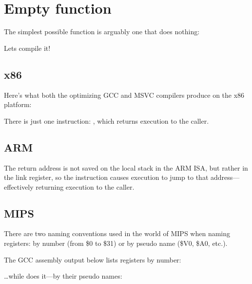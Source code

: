 \section{Empty function}
\label{empty_func}

The simplest possible function is arguably one that does nothing:



Lets compile it!

\subsection{x86}

Here's what both the optimizing GCC and MSVC compilers produce on the x86 platform:



There is just one instruction: \RET, which returns execution to the \gls{caller}.

\subsection{ARM}



The return address is not saved on the local stack in the ARM \ac{ISA}, but rather in the link register, 
so the  instruction causes execution to jump to that address---effectively returning execution
to the \gls{caller}.

\subsection{MIPS}

There are two naming conventions used in the world of MIPS when naming registers:
by number (from \$0 to \$31) or by pseudo name (\$V0, \$A0, etc.).

The GCC assembly output below lists registers by number:



\dots while \IDA does it---by their pseudo names:



